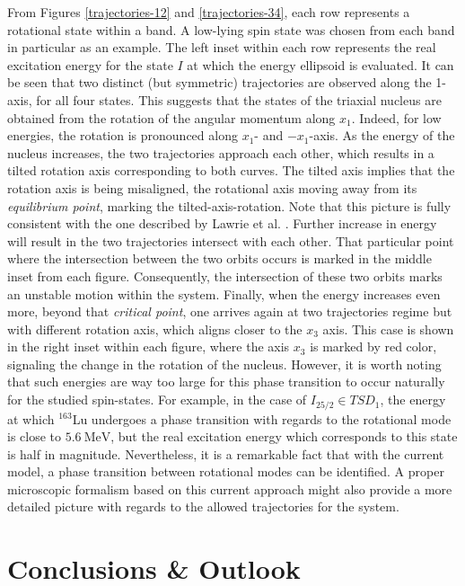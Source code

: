 \documentclass[11pt]{article}
\begin{document}
From Figures \ref{trajectories-12} and \ref{trajectories-34}, each row represents a rotational state within a band. A low-lying spin state was chosen from each band in particular as an example. The left inset within each row represents the real excitation energy for the state $I$ at which the energy ellipsoid is evaluated. It can be seen that two distinct (but symmetric) trajectories are observed along the 1-axis, for all four states. This suggests that the states of the triaxial nucleus are obtained from the rotation of the angular momentum along $x_1$. Indeed, for low energies, the rotation is pronounced along $x_1$- and $-x_1$-axis. As the energy of the nucleus increases, the two trajectories approach each other, which results in a tilted rotation axis corresponding to both curves. The tilted axis implies that the rotation axis is being misaligned, the rotational axis moving away from its \emph{equilibrium point}, marking the tilted-axis-rotation. Note that this picture is fully consistent with the one described by Lawrie et al. \cite{lawrie2020tilted}. Further increase in energy will result in the two trajectories intersect with each other. That particular point where the intersection between the two orbits occurs is marked in the middle inset from each figure. Consequently, the intersection of these two orbits marks an unstable motion within the system. Finally, when the energy increases even more, beyond that \emph{critical point}, one arrives again at two trajectories regime but with different rotation axis, which aligns closer to the $x_3$ axis. This case is shown in the right inset within each figure, where the axis $x_3$ is marked by red color, signaling the change in the rotation of the nucleus. However, it is worth noting that such energies are way too large for this phase transition to occur naturally for the studied spin-states. For example, in the case of $I_{25/2}\in TSD_1$, the energy at which $^{163}$Lu undergoes a phase transition with regards to the rotational mode is close to $5.6\ \text{MeV}$, but the real excitation energy which corresponds to this state is half in magnitude. Nevertheless, it is a remarkable fact that with the current model, a phase transition between rotational modes can be identified. A proper microscopic formalism based on this current approach might also provide a more detailed picture with regards to the allowed trajectories for the system.

\section{Conclusions \& Outlook}
\label{section-gata}
\end{document}
